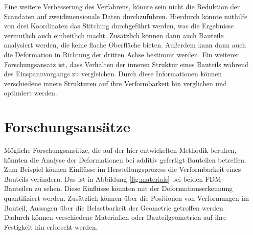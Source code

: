 Eine weitere Verbesserung des Verfahrens, könnte sein nicht die Reduktion der 
Scandaten auf zweidimensionale Daten durchzuführen. 
Hierdurch könnte mithilfe von drei Koordinaten das Stitching durchgeführt werden, 
was die Ergebnisse vermutlich auch einheitlich macht. Zusätzlich können 
dann auch Bauteile analysiert werden, die keine flache Oberfläche bieten.
Außerdem kann dann auch die Deformation in Richtung der dritten Achse bestimmt werden. 
Ein weiterer Forschungsansatz ist, dass Verhalten der inneren Struktur eines Bauteils 
während des Einspannvorgangs zu vergleichen. Durch diese Informationen können 
verschiedene innere Strukturen auf ihre Verformbarkeit hin verglichen und optimiert werden.

\section{Forschungsansätze}

Mögliche Forschungsansätze, die auf der hier entwickelten Methodik beruhen, 
könnten die Analyse der Deformationen bei additiv gefertigt Bauteilen betreffen.
Zum Beispiel können Einflüsse im Herstellungsprozess die Verformbarkeit eines Bauteils
verändern. Das ist in Abbildung \ref{fig:materials} bei beiden FDM-Bauteilen zu sehen.
Diese Einflüsse könnten mit der Deformationserkennung quantifiziert werden.
Zusätzlich können über die Positionen von Verformungen im Bauteil, Aussagen über die 
Belastbarkeit der Geometrie getroffen werden. Dadurch können verschiedene Materialien oder 
Bauteilgeometrien auf ihre Festigkeit hin erforscht werden.

